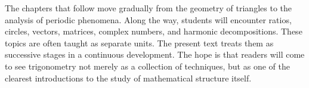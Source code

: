 The chapters that follow move gradually from the geometry of triangles to the
analysis of periodic phenomena. Along the way, students will encounter ratios,
circles, vectors, matrices, complex numbers, and harmonic decompositions. These
topics are often taught as separate units. The present text treats them as
successive stages in a continuous development. The hope is that readers will come
to see trigonometry not merely as a collection of techniques, but as one of the
clearest introductions to the study of mathematical structure itself.
